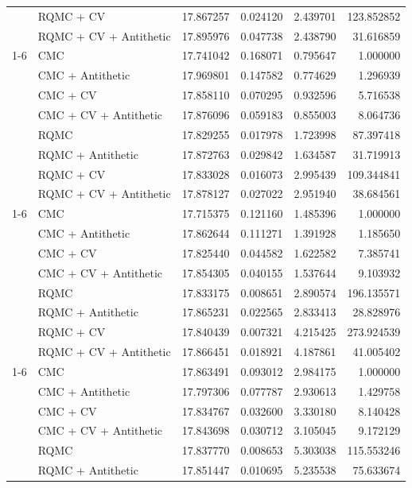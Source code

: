 \begin{tabular}{llrrrr}
 & RQMC + CV & 17.867257 & 0.024120 & 2.439701 & 123.852852 \\
 & RQMC + CV + Antithetic & 17.895976 & 0.047738 & 2.438790 & 31.616859 \\
\cline{1-6}
\multirow[t]{8}{*}{2048} & CMC & 17.741042 & 0.168071 & 0.795647 & 1.000000 \\
 & CMC + Antithetic & 17.969801 & 0.147582 & 0.774629 & 1.296939 \\
 & CMC + CV & 17.858110 & 0.070295 & 0.932596 & 5.716538 \\
 & CMC + CV + Antithetic & 17.876096 & 0.059183 & 0.855003 & 8.064736 \\
 & RQMC & 17.829255 & 0.017978 & 1.723998 & 87.397418 \\
 & RQMC + Antithetic & 17.872763 & 0.029842 & 1.634587 & 31.719913 \\
 & RQMC + CV & 17.833028 & 0.016073 & 2.995439 & 109.344841 \\
 & RQMC + CV + Antithetic & 17.878127 & 0.027022 & 2.951940 & 38.684561 \\
\cline{1-6}
\multirow[t]{8}{*}{4096} & CMC & 17.715375 & 0.121160 & 1.485396 & 1.000000 \\
 & CMC + Antithetic & 17.862644 & 0.111271 & 1.391928 & 1.185650 \\
 & CMC + CV & 17.825440 & 0.044582 & 1.622582 & 7.385741 \\
 & CMC + CV + Antithetic & 17.854305 & 0.040155 & 1.537644 & 9.103932 \\
 & RQMC & 17.833175 & 0.008651 & 2.890574 & 196.135571 \\
 & RQMC + Antithetic & 17.865231 & 0.022565 & 2.833413 & 28.828976 \\
 & RQMC + CV & 17.840439 & 0.007321 & 4.215425 & 273.924539 \\
 & RQMC + CV + Antithetic & 17.866451 & 0.018921 & 4.187861 & 41.005402 \\
\cline{1-6}
\multirow[t]{8}{*}{8192} & CMC & 17.863491 & 0.093012 & 2.984175 & 1.000000 \\
 & CMC + Antithetic & 17.797306 & 0.077787 & 2.930613 & 1.429758 \\
 & CMC + CV & 17.834767 & 0.032600 & 3.330180 & 8.140428 \\
 & CMC + CV + Antithetic & 17.843698 & 0.030712 & 3.105045 & 9.172129 \\
 & RQMC & 17.837770 & 0.008653 & 5.303038 & 115.553246 \\
 & RQMC + Antithetic & 17.851447 & 0.010695 & 5.235538 & 75.633674 \\

\end{tabular}
